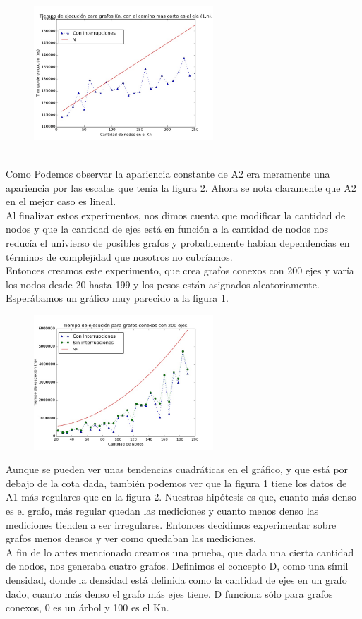 \documentclass[spanish,12pt]{article}
\begin{document}
\begin{figure}[H]
\centering
\includegraphics[width=0.6\textwidth]{KnsoloOptC100r3000}
\caption{}
\end{figure}
\\
Como Podemos observar la apariencia constante de A2 era meramente una apariencia por las escalas que tenía la figura 2. Ahora se nota claramente que A2 en el mejor caso es lineal.
\\
Al finalizar estos experimentos, nos dimos cuenta que modificar la cantidad de nodos y que la cantidad de ejes está en función a la cantidad de nodos nos reducía el univierso de posibles grafos y probablemente habían dependencias en términos de complejidad que nosotros no cubríamos.
\\
 Entonces creamos este experimento, que crea grafos conexos con 200 ejes y varía los nodos desde 20 hasta 199 y los pesos están asignados aleatoriamente. Esperábamos un gráfico muy parecido a la figura 1.

\begin{figure}[H]
\centering
\includegraphics[width=0.6\textwidth]{Conexo200ejesC150r3000}
\caption{}
\end{figure}

Aunque se pueden ver unas tendencias cuadráticas en el gráfico, y que está por debajo de la cota dada, también podemos ver que la figura 1 tiene los datos de A1 más regulares que en la figura 2. Nuestras hipótesis es que, cuanto más denso es el grafo, más regular quedan las mediciones y cuanto menos denso las mediciones tienden a ser irregulares. Entonces decidimos experimentar sobre grafos menos densos y ver como quedaban las mediciones.
\\
A fin de lo antes mencionado creamos una prueba, que dada una cierta cantidad de nodos, nos generaba cuatro grafos. Definimos el concepto D, como una símil densidad, donde la densidad está definida como la cantidad de ejes en un grafo dado, cuanto más denso el grafo más ejes tiene. D funciona sólo para grafos conexos, 0 es un árbol y 100 es el Kn.
\end{document}
